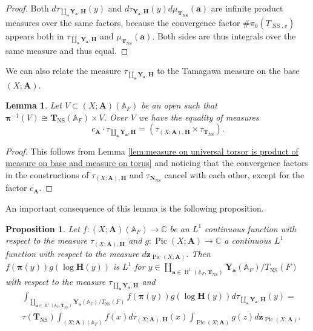 \documentclass[a4paper,11pt,reqno]{amsart}
\newcommand{\C}{\mathbb{C}}
\newcommand{\A}{\mathbb{A}}
\DeclareMathOperator{\Pic}{Pic}
\DeclareMathOperator{\NS}{NS}
\DeclareMathOperator{\HH}{H}
\newtheorem{proposition}[theorem]{Proposition}
\newtheorem{lemma}[theorem]{Lemma}
\theoremstyle{definition}
\begin{document}
\begin{proof}
	Both $d\tau_{\coprod_{\mathbf{a}} \mathbf{Y}_{\mathbf{a}}, \mathbf{H}}(y)$ and $d\tau_{\mathbf{Y}_{\mathbf{a}}, \mathbf{H}}(y) d\mu_{\mathbf{T}_{\NS}}(\mathbf{a})$ are infinite product measures over the same factors, because the convergence factor $\# \pi_0(T_{\NS, v})$ appears both in $\tau_{\coprod_{\mathbf{a}} \mathbf{Y}_{\mathbf{a}}, \mathbf{H}}$ and $\mu_{\mathbf{T}_{\NS}}(\mathbf{a})$. Both sides are thus integrals over the same measure and thus equal.
\end{proof}
We can also relate the measure $\tau_{\coprod_{\mathbf{a}} \mathbf{Y}_{\mathbf{a}}, \mathbf{H}}$ to the Tamagawa measure on the base $(X ; \mathbf{A})$.
\begin{lemma}\label{lem:Tamagawa measure on universal torsor is product of base and torus}
	Let $V \subset (X ; \mathbf{A})(\A_F)$ be an open such that $\bm{\pi}^{-1}(V) \cong \mathbf{T}_{\NS}(\A_F) \times V$. Over $V$ we have the equality of measures
	\[
	c_{\mathbf{A}} \cdot \tau_{\coprod_{\mathbf{a}} \mathbf{Y}_{\mathbf{a}}, \mathbf{H}} = (\tau_{(X ; \mathbf{A}), \mathbf{H}} \times \tau_{\mathbf{T}_{\NS}}).
	\]
\end{lemma}
\begin{proof}
	This follows from Lemma \ref{lem:measure on universal torsor is product of measure on base and measure on torus} and noticing that the convergence factors in the constructions of
	 $\tau_{(X ; \mathbf{A}), \mathbf{H}}$ and $\tau_{\mathbf{N}_{\NS}}$ cancel with each other, except for the factor $c_{\mathbf{A}}$.
\end{proof}
An important consequence of this lemma is the following proposition.
\begin{proposition}\label{prop:Integral over universal torsor and height function}
	Let $f: (X ; \mathbf{A})(\A_F) \to \C$ be an $L^1$ continuous function with respect to the measure $\tau_{(X ; \mathbf{A}), \mathbf{H}}$ and $g: \Pic(X ; \mathbf{A}) \to \C$ a continuous $L^1$ function with respect to the measure $d \mathbf{z}_{\Pic(X ; \mathbf{A})}$. Then $f(\bm{\pi}(y)) g(\log \mathbf{H}(y))$ is $L^1$ for $y \in \coprod_{\mathbf{a} \in \HH^1(\A_F, \mathbf{T}_{\NS})} \mathbf{Y}_{\mathbf{a}}(\A_F)/T_{\NS}(F)$ with respect to the measure $\tau_{\coprod_{\mathbf{a}} \mathbf{Y}_{\mathbf{a}}, \mathbf{H}}$ and
	\[
	\begin{split}
		&\int_{\coprod_{\mathbf{a} \in \HH^1(\A_F, \mathbf{T}_{\NS})} \mathbf{Y}_{\mathbf{a}}(\A_F)/T_{\NS}(F)} f(\bm{\pi}(y)) g(\log \mathbf{H}(y))
		d\tau_{\coprod_{\mathbf{a}} \mathbf{Y}_{\mathbf{a}}, \mathbf{H}}(y) = \\ &\tau(\mathbf{T}_{\NS}) \int_{(X ; \mathbf{A})(\A_F)} f(x) d\tau_{(X ; \mathbf{A}), \mathbf{H}}(x) \int_{\Pic(X ; \mathbf{A})} g(z) d \mathbf{z}_{\Pic(X ; \mathbf{A})}.
	\end{split}
	\]
\end{proposition}
\end{document}
